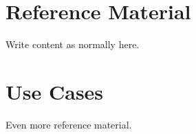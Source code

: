 \documentclass[
    12pt                               %
    ]{article}
\begin{document}




%
%

\appendix
\section{Reference Material}

Write content as normally here.


\section{Use Cases}

Even more reference material.


%
%

\printacronyms[include-classes=abbrev,name=Abbreviations]
\end{document}
